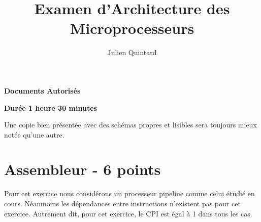%
%
%
%
%
%

%
%

\def\path{../../../..}

%
%



%
%


%
%

\title{Examen d'Architecture des Microprocesseurs}

%
%

\author{\small{Julien Quintard}}

%
%



%
%

\maketitle

%
%

\begin{center}

\textbf{Documents Autoris\'es}

\textbf{Dur\'ee 1 heure 30 minutes}

\scriptsize{Une copie bien pr\'esent\'ee avec des sch\'emas propres et
	    lisibles sera toujours mieux not\'ee qu'une autre.}

\end{center}

%
%

%
%

\section{Assembleur - 6 points}

Pour cet exercice nous consid\'erons un processeur pipeline comme celui
\'etudi\'e en cours. N\'eanmoins les d\'ependances entre instructions
n'existent pas pour cet exercice. Autrement dit, pour cet exercice,
le CPI est \'egal \`a 1 dans tous les cas.

